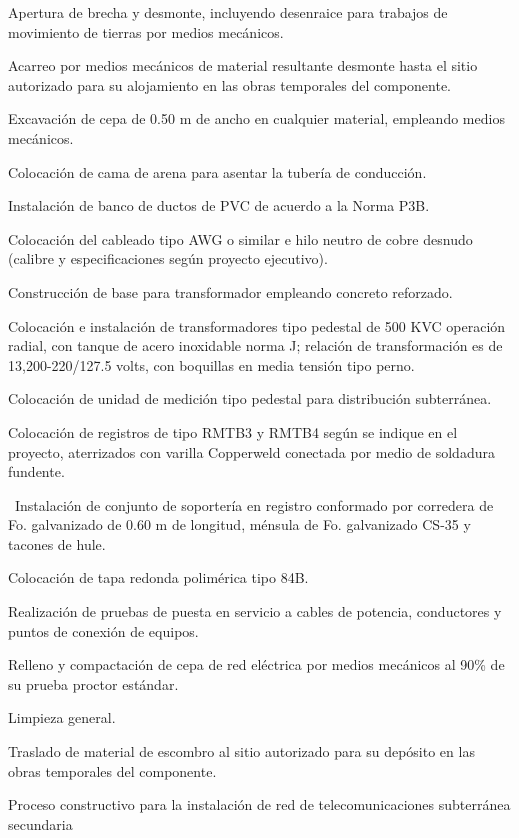\documentclass{article}
\begin{document}
Apertura de brecha y desmonte, incluyendo desenraice para trabajos de movimiento de tierras por medios mecánicos.

Acarreo por medios mecánicos de material resultante desmonte hasta el sitio autorizado para su alojamiento en las obras temporales del componente.

Excavación de cepa de 0.50 m de ancho en cualquier material, empleando medios mecánicos.

Colocación de cama de arena para asentar la tubería de conducción.

Instalación de banco de ductos de PVC de acuerdo a la Norma P3B.

Colocación del cableado tipo AWG o similar e hilo neutro de cobre desnudo (calibre y especificaciones según proyecto ejecutivo).

Construcción de base para transformador empleando concreto reforzado.

Colocación e instalación de transformadores tipo pedestal de 500 KVC operación radial, con tanque de acero inoxidable norma J; relación de transformación es de 13,200-220/127.5 volts, con boquillas en media tensión tipo perno. 

Colocación de unidad de medición tipo pedestal para distribución subterránea.

Colocación de registros de tipo RMTB3 y RMTB4 según se indique en el proyecto, aterrizados con varilla Copperweld conectada por medio de soldadura fundente.

\ Instalación de conjunto de soportería en registro conformado por corredera de Fo. galvanizado de 0.60 m de longitud, ménsula de Fo. galvanizado CS-35 y tacones de hule.

Colocación de tapa redonda polimérica tipo 84B.

Realización de pruebas de puesta en servicio a cables de potencia, conductores y puntos de conexión de equipos.

Relleno y compactación de cepa de red eléctrica por medios mecánicos al 90\% de su prueba proctor estándar.

Limpieza general.

Traslado de material de escombro al sitio autorizado para su depósito en las obras temporales del componente.


\bigskip


\bigskip

Proceso constructivo para la instalación de red de telecomunicaciones subterránea secundaria
\end{document}
